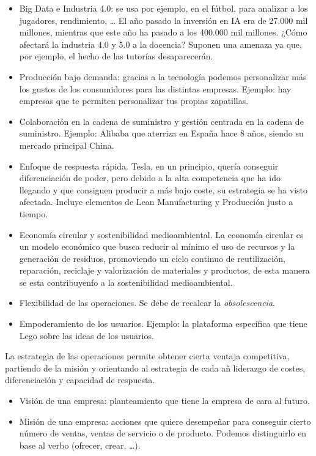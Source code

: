 \documentclass[12pt]{report} %
\providecommand{\tightlist}{%
  \setlength{\itemsep}{0pt}\setlength{\parskip}{0pt}}
\begin{document}
\begin{itemize}
\tightlist
\item
  Big Data e Industria 4.0: se usa por ejemplo, en el fútbol, para
  analizar a los jugadores, rendimiento, \ldots{} El año pasado la
  inversión en IA era de 27.000 mil millones, mientras que este año ha
  pasado a los 400.000 mil millones. ¿Cómo afectará la industria 4.0 y
  5.0 a la docencia? Suponen una amenaza ya que, por ejemplo, el hecho
  de las tutorías desaparecerán.
\item
  Producción bajo demanda: gracias a la tecnología podemos personalizar
  más los gustos de los consumidores para las distintas empresas.
  Ejemplo: hay empresas que te permiten personalizar tus propias
  zapatillas.
\item
  Colaboración en la cadena de suministro y gestión centrada en la
  cadena de suministro. Ejemplo: Alibaba que aterriza en España hace 8
  años, siendo su mercado principal China.
\item
  Enfoque de respuesta rápida. Tesla, en un principio, quería conseguir
  diferenciación de poder, pero debido a la alta competencia que ha ido
  llegando y que consiguen producir a más bajo coste, su estrategia se
  ha visto afectada. Incluye elementos de Lean Manufacturing y
  Producción justo a tiempo.
\item
  Economía circular y sostenibilidad medioambiental. La economía
  circular es un modelo económico que busca reducir al mínimo el uso de
  recursos y la generación de residuos, promoviendo un ciclo continuo de
  reutilización, reparación, reciclaje y valorización de materiales y
  productos, de esta manera se esta contribuyenfo a la sostenibilidad
  medioambiental.
\item
  Flexibilidad de las operaciones. Se debe de recalcar la
  \emph{obsolescencia}.
\item
  Empoderamiento de los usuarios. Ejemplo: la plataforma específica que
  tiene Lego sobre las ideas de los usuarios.
\end{itemize}

La estrategia de las operaciones permite obtener cierta ventaja
competitiva, partiendo de la misión y orientando al estrategia de cada
añ liderazgo de costes, diferenciación y capacidad de respuesta.

\begin{itemize}
\tightlist
\item
  Visión de una empresa: planteamiento que tiene la empresa de cara al
  futuro.
\item
  Misión de una empresa: acciones que quiere desempeñar para conseguir
  cierto número de ventas, ventas de servicio o de producto. Podemos
  distinguirlo en base al verbo (ofrecer, crear, \ldots).
\end{itemize}
\end{document}
